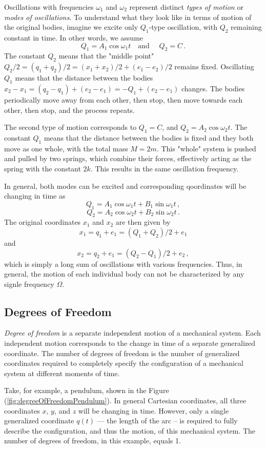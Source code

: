 Oscillations with frequencies $\omega_1$ and $\omega_2$ represent distinct \emph{types of motion} or \emph{modes of oscillations}. To understand what they look like in terms of motion of the original bodies, imagine we excite only $Q_1$-type oscillation, with $Q_2$ remaining constant in time. In other words, we assume
\[
Q_1 = A_1\cos\omega_1 t\quad\textrm{and }\quad Q_2 = C\,.
\]
The constant $Q_2$ means that the "middle point" $Q_2/2 = (q_1+q_2)/2=(x_1+x_2)/2+(e_1-e_2)/2$ remains fixed. Oscillating $Q_1$ means that the distance between the bodies $x_2-x_1=(q_2-q_1)+(e_2-e_1)=-Q_1+(e_2-e_1)$ changes. The bodies periodically move away from each other, then stop, then move towards each other, then stop, and the process repeats.

The second type of motion corresponds to $Q_1=C$, and $Q_2 = A_2\cos\omega_2 t$. The constant $Q_1$ means that the distance between the bodies is fixed and they both move as one whole, with the total mass $M=2m$. This "whole" system is pushed and pulled by two springs, which combine their forces, effectively acting as the spring with the constant $2k$. This results in the same oscillation frequency.

In general, both modes can be excited and corresponding qoordinates will be changing in time as
\[
Q_1 = A_1\cos\omega_1 t + B_1\sin\omega_1 t\,,
\]
\[
Q_2 = A_2\cos\omega_2 t + B_2\sin\omega_2 t\,.
\]
The original coordinates $x_1$ and $x_2$ are then given by
\[
x_1 = q_1 + e_1 = (Q_1+Q_2)/2 + e_1
\]
and
\[
x_2 = q_2 + e_1 = (Q_2-Q_1)/2 + e_2\,,
\]
which is simply a long sum of oscillations with various frequencies. Thus, in general, the motion of each individual body can not be characterized by any signle frequency $\Omega$.


\subsection{Degrees of Freedom}
\emph{Degree of freedom} is a separate independent motion of a
mechanical system. Each independent motion corresponds to the change
in time
of a separate generalized coordinate. The number of degrees of freedom
is the number of
generalized coordinates required to completely specify the
configuration of a mechanical system at different moments of time.

Take, for example, a pendulum, shown in the Figure
(\ref{fig:degreeOfFreedomPendulum}). In general Cartesian coordinates,
all three coordinates $x$, $y$, and $z$ will be changing in
time. However, only a single generalized coordinate $q(t)$ --- the
length of the arc -- is required to fully describe the configuration,
and thus the motion, of this mechanical system. The number of degrees
of freedom, in this example, equals 1.

